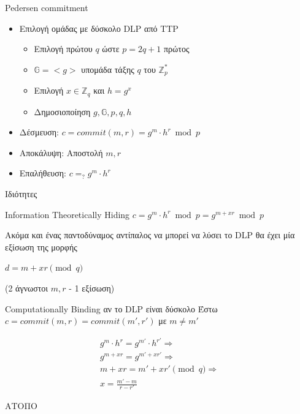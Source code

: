 \documentclass[handout]{beamer}
\begin{document}
\begin{frame}{Pedersen commitment}
\begin{itemize}
\item  Επιλογή ομάδας με δύσκολο DLP από TTP
\begin{itemize}
\item Επιλογή πρώτου $q$ ώστε $p=2q+1$ πρώτος
\item $\mathbb{G}=<g>$ υπομάδα τάξης $q$ του $\mathbb{Z}_p^*$
\item Επιλογή $x \in \mathbb{Z}_q$ και $h=g^x$
\item Δημοσιοποίηση $g,\mathbb{G},p,q,h$
\end{itemize}
\pause
\item Δέσμευση: $c=commit(m,r) = g^m \cdot h^r \bmod{p}$
\pause
\item Αποκάλυψη: Αποστολή $m,r$
\pause
\item Επαλήθευση: $c =_? g^m \cdot h^r$
\end{itemize}
\end{frame}

\begin{frame}[allowframebreaks]{Ιδιότητες}
\begin{block}{Information Theoretically Hiding}
$c = g^m \cdot h^r \bmod{p}=g^{m+xr} \bmod{p}$

Ακόμα και ένας παντοδύναμος αντίπαλος να μπορεί να λύσει το DLP θα έχει μία εξίσωση της μορφής

$d = m+xr \pmod{q}$ 

(2 άγνωστοι $m,r$ - 1 εξίσωση)
\end{block}

\framebreak

\begin{block}{Computationally Binding αν το DLP είναι δύσκολο}
Έστω $c=commit(m,r)=commit(m',r')$ με $m \neq m'$

\begin{align*}
g^m \cdot h^r = g^{m'} \cdot h^{r'} \Rightarrow \\
g^{m+xr} = g^{m' + xr'} \Rightarrow \\
m+xr=m'+xr' \pmod{q} \Rightarrow \\
x = \frac{m'-m}{r-r'}
\end{align*}

\alert{ΑΤΟΠΟ}
\end{block}
\end{frame}
\end{document}
